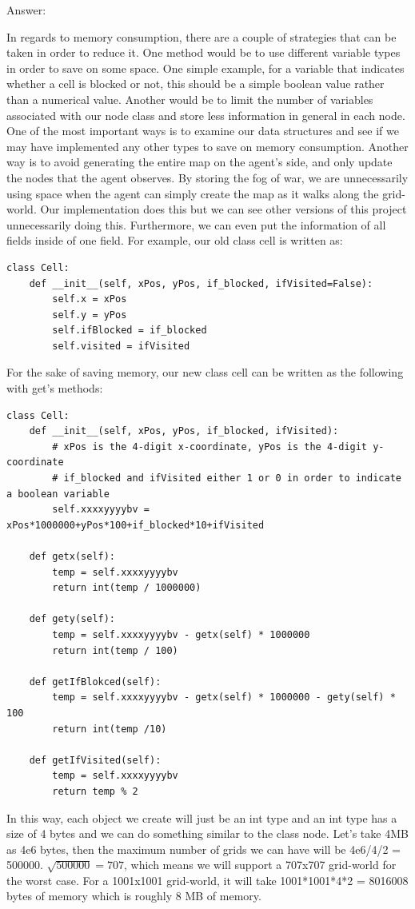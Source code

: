 \documentclass{article}
\begin{document}
Answer: \newline
\par In regards to memory consumption, there are a couple of strategies that can be taken in order to reduce it. One method would be to use different variable types in order to save on some space. One simple example, for a variable that indicates whether a cell is blocked or not, this should be a simple boolean value rather than a numerical value. Another would be to limit the number of variables associated with our node class and store less information in general in each node. One of the most important ways is to examine our data structures and see if we may have implemented any other types to save on memory consumption. Another way is to avoid generating the entire map on the agent’s side, and only update the nodes that the agent observes. By storing the fog of war, we are unnecessarily using space when the agent can simply create the map as it walks along the grid-world. Our implementation does this but we can see other versions of this project unnecessarily doing this.
Furthermore, we can even put the information of all fields inside of one field. For example, our old class cell is written as:

\begin{lstlisting}
class Cell:
    def __init__(self, xPos, yPos, if_blocked, ifVisited=False):
        self.x = xPos
        self.y = yPos
        self.ifBlocked = if_blocked
        self.visited = ifVisited

\end{lstlisting}


For the sake of saving memory, our new class cell can be written as the following with get's methods:
\begin{lstlisting}
class Cell:
	def __init__(self, xPos, yPos, if_blocked, ifVisited):
    	# xPos is the 4-digit x-coordinate, yPos is the 4-digit y-coordinate
        # if_blocked and ifVisited either 1 or 0 in order to indicate a boolean variable
        self.xxxxyyyybv = xPos*1000000+yPos*100+if_blocked*10+ifVisited

	def getx(self):
        temp = self.xxxxyyyybv
        return int(temp / 1000000)

	def gety(self):
        temp = self.xxxxyyyybv - getx(self) * 1000000
        return int(temp / 100)

	def getIfBlokced(self):
        temp = self.xxxxyyyybv - getx(self) * 1000000 - gety(self) * 100
        return int(temp /10)

	def getIfVisited(self):
        temp = self.xxxxyyyybv
        return temp % 2
\end{lstlisting}


\par In this way, each object we create will just be an int type and an int type has a size of 4 bytes and we can do something similar to the class node. Let's take 4MB as 4e6 bytes, then the maximum number of grids we can have will be 4e6/4/2 = 500000. $\sqrt{500000}=707$, which means we will support a 707x707 grid-world for the worst case. For a 1001x1001 grid-world, it will take 1001*1001*4*2 = 8016008 bytes of memory which is roughly 8 MB of memory.
\end{document}
